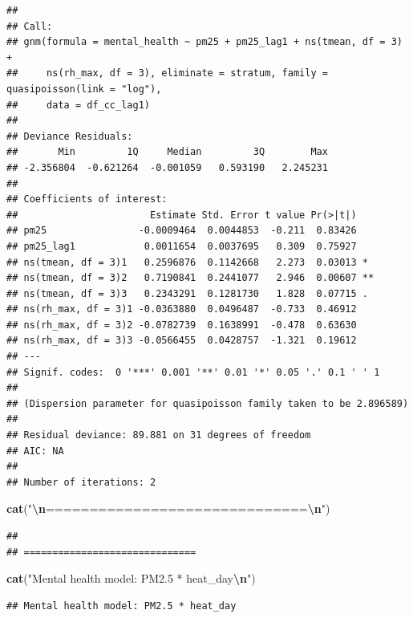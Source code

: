 \documentclass[
]{article}
\newenvironment{Shaded}{\begin{snugshade}}{\end{snugshade}}
\newcommand{\FunctionTok}[1]{\textcolor[rgb]{0.13,0.29,0.53}{\textbf{#1}}}
\newcommand{\NormalTok}[1]{#1}
\newcommand{\SpecialCharTok}[1]{\textcolor[rgb]{0.81,0.36,0.00}{\textbf{#1}}}
\newcommand{\StringTok}[1]{\textcolor[rgb]{0.31,0.60,0.02}{#1}}
\begin{document}
\begin{verbatim}
## 
## Call:
## gnm(formula = mental_health ~ pm25 + pm25_lag1 + ns(tmean, df = 3) + 
##     ns(rh_max, df = 3), eliminate = stratum, family = quasipoisson(link = "log"), 
##     data = df_cc_lag1)
## 
## Deviance Residuals: 
##       Min         1Q     Median         3Q        Max  
## -2.356804  -0.621264  -0.001059   0.593190   2.245231  
## 
## Coefficients of interest:
##                       Estimate Std. Error t value Pr(>|t|)   
## pm25                -0.0009464  0.0044853  -0.211  0.83426   
## pm25_lag1            0.0011654  0.0037695   0.309  0.75927   
## ns(tmean, df = 3)1   0.2596876  0.1142668   2.273  0.03013 * 
## ns(tmean, df = 3)2   0.7190841  0.2441077   2.946  0.00607 **
## ns(tmean, df = 3)3   0.2343291  0.1281730   1.828  0.07715 . 
## ns(rh_max, df = 3)1 -0.0363880  0.0496487  -0.733  0.46912   
## ns(rh_max, df = 3)2 -0.0782739  0.1638991  -0.478  0.63630   
## ns(rh_max, df = 3)3 -0.0566455  0.0428757  -1.321  0.19612   
## ---
## Signif. codes:  0 '***' 0.001 '**' 0.01 '*' 0.05 '.' 0.1 ' ' 1
## 
## (Dispersion parameter for quasipoisson family taken to be 2.896589)
## 
## Residual deviance: 89.881 on 31 degrees of freedom
## AIC: NA
## 
## Number of iterations: 2
\end{verbatim}

\begin{Shaded}
\begin{Highlighting}[]
\FunctionTok{cat}\NormalTok{(}\StringTok{"}\SpecialCharTok{\textbackslash{}n}\StringTok{==============================}\SpecialCharTok{\textbackslash{}n}\StringTok{"}\NormalTok{)}
\end{Highlighting}
\end{Shaded}

\begin{verbatim}
## 
## ==============================
\end{verbatim}

\begin{Shaded}
\begin{Highlighting}[]
\FunctionTok{cat}\NormalTok{(}\StringTok{"Mental health model: PM2.5 * heat\_day}\SpecialCharTok{\textbackslash{}n}\StringTok{"}\NormalTok{)}
\end{Highlighting}
\end{Shaded}

\begin{verbatim}
## Mental health model: PM2.5 * heat_day
\end{verbatim}
\end{document}
